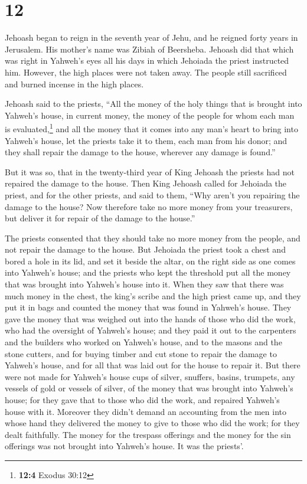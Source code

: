 \hypertarget{section-11}{%
\section{12}\label{section-11}}

 Jehoash began to reign in the seventh year of Jehu, and
he reigned forty years in Jerusalem. His mother's name was Zibiah of
Beersheba.  Jehoash did that which was right in Yahweh's
eyes all his days in which Jehoiada the priest instructed him.
 However, the high places were not taken away. The people
still sacrificed and burned incense in the high places.

 Jehoash said to the priests, ``All the money of the holy
things that is brought into Yahweh's house, in current money, the money
of the people for whom each man is evaluated,\footnote{\textbf{12:4}
  Exodus 30:12} and all the money that it comes into any man's heart to
bring into Yahweh's house,  let the priests take it to
them, each man from his donor; and they shall repair the damage to the
house, wherever any damage is found.''

 But it was so, that in the twenty-third year of King
Jehoash the priests had not repaired the damage to the house.
 Then King Jehoash called for Jehoiada the priest, and for
the other priests, and said to them, ``Why aren't you repairing the
damage to the house? Now therefore take no more money from your
treasurers, but deliver it for repair of the damage to the house.''

 The priests consented that they should take no more money
from the people, and not repair the damage to the house. 
But Jehoiada the priest took a chest and bored a hole in its lid, and
set it beside the altar, on the right side as one comes into Yahweh's
house; and the priests who kept the threshold put all the money that was
brought into Yahweh's house into it.  When they saw that
there was much money in the chest, the king's scribe and the high priest
came up, and they put it in bags and counted the money that was found in
Yahweh's house.  They gave the money that was weighed out
into the hands of those who did the work, who had the oversight of
Yahweh's house; and they paid it out to the carpenters and the builders
who worked on Yahweh's house,  and to the masons and the
stone cutters, and for buying timber and cut stone to repair the damage
to Yahweh's house, and for all that was laid out for the house to repair
it.  But there were not made for Yahweh's house cups of
silver, snuffers, basins, trumpets, any vessels of gold or vessels of
silver, of the money that was brought into Yahweh's house;
 for they gave that to those who did the work, and
repaired Yahweh's house with it.  Moreover they didn't
demand an accounting from the men into whose hand they delivered the
money to give to those who did the work; for they dealt faithfully.
 The money for the trespass offerings and the money for
the sin offerings was not brought into Yahweh's house. It was the
priests'.

